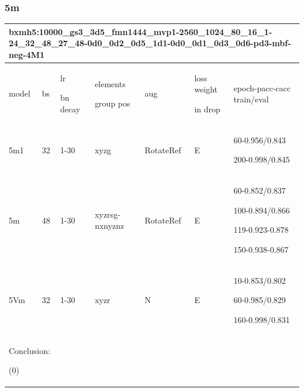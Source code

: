 \documentclass{article}
\begin{document}
\subsubsection{5m}
\noindent
\begin{tabular}{|p{1.5cm}|p{1.5cm}|p{1cm}|p{1.5cm}|p{1.5cm}|p{1.5cm}|p{5cm}| }
	\hline
	\multicolumn{7}{|p{14cm}|}{bxmh5:10000\_gs3\_3d5\_fmn1444\_mvp1-2560\_1024\_80\_16\_1-24\_32\_48\_27\_48-0d0\_0d2\_0d5\_1d1-0d0\_0d1\_0d3\_0d6-pd3-mbf-neg-4M1\par 
		 }\\
	\hline
	model & bs& lr\par bn decay & elements\par group pos & aug & loss weight\par in drop & epoch-pacc-cacc train/eval \\
	\hline
	
	5m1 & 32 & 1-30 & xyzg & RotateRef & E & 60-0.956/0.843\par 200-0.998/0.845\\
	\hline 
	5m & 48 & 1-30 & xyzrsg-nxnyznz & RotateRef & E & 60-0.852/0.837\par 100-0.894/0.866\par 119-0.923-0.878\par 150-0.938-0.867\\
	\hline 
	5Vm & 32 & 1-30 & xyzr & N & E &10-0.853/0.802\par 60-0.985/0.829\par 160-0.998/0.831\\
	\hline 
	\multicolumn{7}{|p{16cm}|}{ Conclusion:\par	
		(0)  } \\
	\hline	
\end{tabular}
\end{document}
